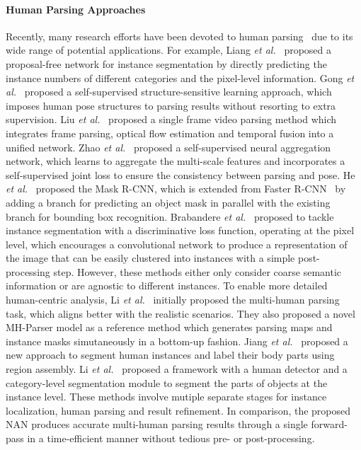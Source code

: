 \documentclass[10pt,twocolumn,letterpaper]{article}
\theoremstyle{definition}
\theoremstyle{remark}
\begin{document}
\paragraph{Human Parsing Approaches} Recently, many research efforts have been devoted to human parsing~\cite{liang2015proposal, gong2017look, liu2017surveillance, zhao2017self, he2017mask, de2017semantic, li2017towards, jiang2016detangling, li2017holistic} due to its wide range of potential applications. For example, Liang \emph{et al.}~\cite{liang2015proposal} proposed a proposal-free network
for instance segmentation by directly predicting the instance numbers of different categories and the pixel-level information. Gong \emph{et al.}~\cite{gong2017look} proposed a self-supervised structure-sensitive learning approach, which imposes human pose structures to parsing
results without resorting to extra supervision. Liu \emph{et al.}~\cite{liu2017surveillance} proposed a single frame video parsing method which integrates frame parsing, optical flow estimation and temporal fusion into a unified network. Zhao \emph{et al.}~\cite{zhao2017self} proposed a self-supervised neural aggregation
network, which learns to aggregate the multi-scale features and incorporates a self-supervised joint loss to ensure the consistency between parsing and pose. He \emph{et al.}~\cite{he2017mask} proposed the Mask R-CNN, which is extended from Faster R-CNN~\cite{ren2015faster} by adding a branch for predicting an object mask in parallel with the existing branch for bounding box recognition. Brabandere \emph{et al.}~\cite{de2017semantic} proposed to tackle instance segmentation with a discriminative loss function, operating at the pixel level, which encourages a convolutional network to produce a representation of the image that can be easily clustered into instances with a simple post-processing step. However, these methods either only consider coarse semantic information or are agnostic to different instances. To enable more detailed human-centric analysis, Li \emph{et al.}~\cite{li2017towards} initially proposed the multi-human parsing task, which aligns better with the realistic scenarios. They also proposed a novel MH-Parser model as a reference method which generates parsing maps and instance masks simutaneously in a bottom-up fashion. Jiang \emph{et al.}~\cite{jiang2016detangling} proposed a new approach to segment human instances and label their body parts using region assembly. Li \emph{et al.}~\cite{li2017holistic} proposed a framework with a human detector and a category-level segmentation module to segment the parts of objects at the instance level. These methods involve mutiple separate stages for instance localization, human parsing and result refinement. In comparison, the proposed NAN produces accurate multi-human parsing results through a single forward-pass in a time-efficient manner without tedious pre- or post-processing.
\end{document}
